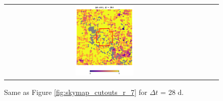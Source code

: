 \documentclass[preprintm,linenumbers]{aastex631}
\begin{document}
\begin{figure}
\begin{tabular}{  c c c}
				\includegraphics[width=0.3\textwidth]{results/skymaps_cutout/skymaps_cutout_delta_first_year_one_snap_v4_0_10yrs_db_noDD_noTwi_tscale-28_nside-256_doAllTemplateMetrics_reduceCount_r_GP_noDD_noTwi.pdf} \\
			\end{tabular}
			\caption{
				 Same as Figure \ref{fig:skymap_cutouts_r_7} for $\Delta t$ = 28 d.  
			}
   \label{fig:skymap_cutouts_r_28}
		\end{figure}



  
		

  		

    
	
\end{document}
